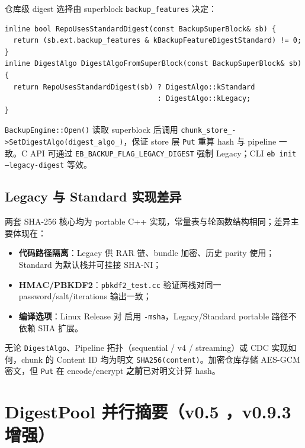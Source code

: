 仓库级 digest 选择由 superblock \texttt{backup\_features} 决定：

\begin{lstlisting}[caption={DigestAlgo 从 superblock 解析（\filepath{digest.h}）},label={lst:digest-from-sb}]
inline bool RepoUsesStandardDigest(const BackupSuperBlock& sb) {
  return (sb.ext.backup_features & kBackupFeatureDigestStandard) != 0;
}
inline DigestAlgo DigestAlgoFromSuperBlock(const BackupSuperBlock& sb) {
  return RepoUsesStandardDigest(sb) ? DigestAlgo::kStandard
                                    : DigestAlgo::kLegacy;
}
\end{lstlisting}

\texttt{BackupEngine::Open()} 读取 superblock 后调用 \texttt{chunk\_store\_->SetDigestAlgo(digest\_algo\_)}，保证 store 层 \texttt{Put} 重算 hash 与 pipeline 一致。C API 可通过 \texttt{EB\_BACKUP\_FLAG\_LEGACY\_DIGEST} 强制 Legacy；CLI \texttt{eb init --legacy-digest} 等效。

\subsection{Legacy 与 Standard 实现差异}

两套 SHA-256 核心均为 portable C++ 实现，常量表与轮函数结构相同；差异主要体现在：

\begin{itemize}
  \item \textbf{代码路径隔离}：Legacy 供 RAR 链、bundle 加密、历史 parity 使用；Standard 为默认栈并可挂接 SHA-NI；
  \item \textbf{HMAC/PBKDF2}：\texttt{pbkdf2\_test.cc} 验证两栈对同一 password/salt/iterations 输出一致；
  \item \textbf{编译选项}：Linux Release 对  启用 \texttt{-msha}，Legacy/Standard portable 路径不依赖 SHA 扩展。
\end{itemize}

\begin{invariantbox}
无论 \texttt{DigestAlgo}、Pipeline 拓扑（sequential / v4 / streaming）或 CDC 实现如何，chunk 的 Content ID 均为明文 \texttt{SHA256(content)}。加密仓库存储 AES-GCM 密文，但 \texttt{Put} 在 encode/encrypt \textbf{之前}已对明文计算 hash。
\end{invariantbox}

\section{DigestPool 并行摘要（v0.5 ，v0.9.3 增强）}

